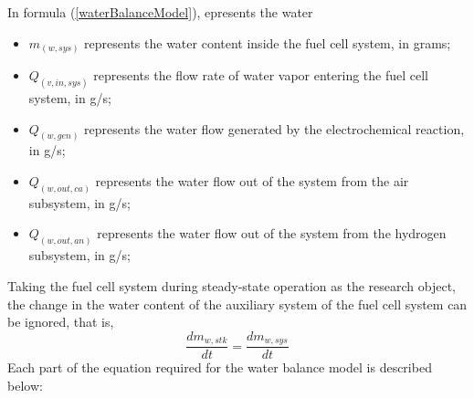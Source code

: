 In formula (\ref{waterBalanceModel}), epresents the water
\begin{itemize}
	\item $m_(w,sys)$ represents the water content inside the fuel cell system, in grams; %
	\item $Q_(v,in,sys)$ represents the flow rate of water vapor entering the fuel cell system, in g/s; %
	\item $Q_(w,gen)$ represents the water flow generated by the electrochemical reaction, in g/s; %
	\item $Q_(w,out,ca)$ represents the water flow out of the system from the air subsystem, in g/s; %
	\item $Q_(w,out,an)$ represents the water flow out of the system from the hydrogen subsystem, in g/s; %
\end{itemize}
Taking the fuel cell system during steady-state operation as the research object, the change in the water content of the auxiliary system of the fuel cell system can be ignored, that is,
\begin{equation}\label{changeInWaterContent}
	\frac{d m_{w,s t k}}{d t}=\frac{d m_{w,s y s}}{d t}
\end{equation}
Each part of the equation required for the water balance model is described below:
